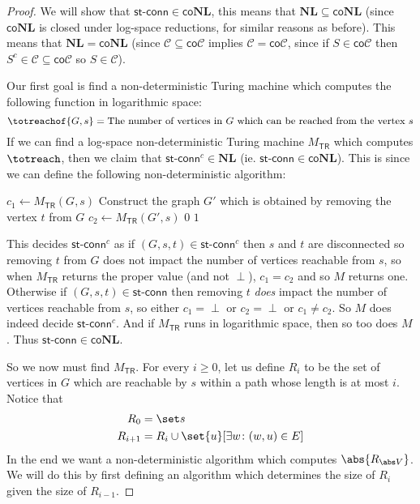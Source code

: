 \documentclass[10pt]{article}
\def\stconn{\textsf{st-conn}}
\def\co{\mathsf{co}}
\def\NL{\mathbf{NL}}
\begin{document}
\begin{proof}

    \def\tr{\mathsf{TR}}

    We will show that $\stconn\in\co\NL$, this means that $\NL\subseteq\co\NL$ (since $\co\NL$ is closed under log-space reductions, for similar reasons as before).
    This means that $\NL=\co\NL$ (since $\mathcal C\subseteq\co\mathcal C$ implies $\mathcal C=\co\mathcal C$, since if $S\in\co\mathcal C$ then $S^c\in\mathcal C\subseteq\co\mathcal C$ so $S\in\mathcal C$).

    Our first goal is find a non-deterministic Turing machine which computes the following function in logarithmic space:
    \[ \totreachof{G,s} = \text{The number of vertices in $G$ which can be reached from the vertex $s$} \]
    If we can find a log-space non-deterministic Turing machine $M_\tr$ which computes $\totreach$, then we claim that $\stconn^c\in\NL$ (ie. $\stconn\in\co\NL$).
    This is since we can define the following non-deterministic algorithm:

    \algorithm
            \State $c_1\gets M_\tr(G,s)$
            \State Construct the graph $G'$ which is obtained by removing the vertex $t$ from $G$
            \State $c_2\gets M_\tr(G',s)$
             \Return $0$
            \lElse \Return $1$
        \EndFunc
    \ealgorithm

    This decides $\stconn^c$ as if $(G,s,t)\in\stconn^c$ then $s$ and $t$ are disconnected so removing $t$ from $G$ does not impact the number of vertices reachable from $s$, so when $M_\tr$ returns the
    proper value (and not $\perp$), $c_1=c_2$ and so $M$ returns one.
    Otherwise if $(G,s,t)\in\stconn$ then removing $t$ \emph{does} impact the number of vertices reachable from $s$, so either $c_1=\perp$ or $c_2=\perp$ or $c_1\neq c_2$.
    So $M$ does indeed decide $\stconn^c$.
    And if $M_\tr$ runs in logarithmic space, then so too does $M$.
    Thus $\stconn\in\co\NL$.

    So we now must find $M_\tr$.
    For every $i\geq0$, let us define $R_i$ to be the set of vertices in $G$ which are reachable by $s$ within a path whose length is at most $i$.
    Notice that
    \begin{align*}
        R_0 &= \set s \\
        R_{i+1} &= R_i\cup\set{u}[\exists w\colon (w,u)\in E]
    \end{align*}
    In the end we want a non-deterministic algorithm which computes $\abs{R_{\abs V}}$.
    We will do this by first defining an algorithm which determines the size of $R_i$ given the size of $R_{i-1}$.


\end{proof}
\end{document}
